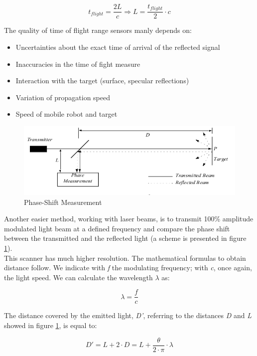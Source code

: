 \[
t_{flight} = \frac{2L}{c}  \Longrightarrow  L = \frac{t_{flight}}{2}\cdot c
\]

The quality of time of flight range sensors manly depends on:

\begin{itemize}
\item Uncertainties about the exact time of arrival of the reflected signal
\item Inaccuracies in the time of fight measure
\item Interaction with the target (surface, specular reflections)
\item Variation of propagation speed
\item Speed of mobile robot and target
\end{itemize}

\begin{figure} [h]
  \begin{center}
    \includegraphics[width=\textwidth]{img/laser_shift_phase.png}
    \caption{Phase-Shift Measurement}
    \label{fig:laser_shift_phase}
  \end{center}
\end{figure}

Another easier method, working with laser beams, is to transmit 100\%
amplitude modulated light beam at a defined frequency and compare
the phase shift between the transmitted and the reflected light (a scheme
is presented in figure \ref{fig:laser_shift_phase}).
\\
This scanner has much higher resolution. The mathematical formulas to
obtain distance follow. We indicate with \textit{f} the modulating
frequency; with \textit{c}, once again, the light speed. We can calculate
the wavelength \textit{$\lambda$} as:

\[
\lambda = \frac{f}{c}
\]

The distance covered by the emitted light, \textit{D'}, referring to
the distances \textit{D} and \textit{L} showed in figure
\ref{fig:laser_shift_phase}, is equal to:

\[
D' = L + 2 \cdot D = L + \frac{\theta}{2\cdot\pi}\cdot\lambda
\]

